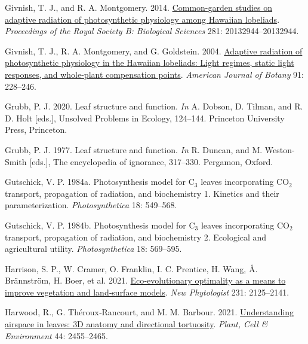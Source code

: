 \documentclass[
  letterpaper,
  DIV=11,
  numbers=noendperiod]{scrartcl}
\newlength{\cslhangindent}
\newlength{\cslentryspacingunit} %
\newenvironment{CSLReferences}[2] %
 {%
  \setlength{\parindent}{0pt}
  \ifodd #1
  \let\oldpar\par
  \def\par{\hangindent=\cslhangindent\oldpar}
  \fi
  \setlength{\parskip}{#2\cslentryspacingunit}
 }%
 {}
\begin{document}
\begin{CSLReferences}{1}{0}
\leavevmode{}%
Givnish, T. J., and R. A. Montgomery. 2014.
\href{https://doi.org/10.1098/rspb.2013.2944}{Common-garden studies on
adaptive radiation of photosynthetic physiology among {Hawaiian}
lobeliads}. \emph{Proceedings of the Royal Society B: Biological
Sciences} 281: 20132944--20132944.

\leavevmode{}%
Givnish, T. J., R. A. Montgomery, and G. Goldstein. 2004.
\href{https://doi.org/10.3732/ajb.91.2.228}{Adaptive radiation of
photosynthetic physiology in the {Hawaiian} lobeliads: Light regimes,
static light responses, and whole-plant compensation points}.
\emph{American Journal of Botany} 91: 228--246.

\leavevmode{}%
Grubb, P. J. 2020. Leaf structure and function. \emph{In} A. Dobson, D.
Tilman, and R. D. Holt {[}eds.{]}, Unsolved {Problems} in {Ecology},
124--144. Princeton University Press, Princeton.

\leavevmode{}%
Grubb, P. J. 1977. Leaf structure and function. \emph{In} R. Duncan, and
M. Weston-Smith {[}eds.{]}, The encyclopedia of ignorance, 317--330.
Pergamon, Oxford.

\leavevmode{}%
Gutschick, V. P. 1984a. Photosynthesis model for {C}\(_{\textrm{3}}\)
leaves incorporating {CO}\(_{\textrm{2}}\) transport, propagation of
radiation, and biochemistry 1. Kinetics and their parameterization.
\emph{Photosynthetica} 18: 549--568.

\leavevmode{}%
Gutschick, V. P. 1984b. Photosynthesis model for {C}\(_{\textrm{3}}\)
leaves incorporating {CO}\(_{\textrm{2}}\) transport, propagation of
radiation, and biochemistry 2. Ecological and agricultural utility.
\emph{Photosynthetica} 18: 569--595.

\leavevmode{}%
Harrison, S. P., W. Cramer, O. Franklin, I. C. Prentice, H. Wang, Å.
Brännström, H. Boer, et al. 2021.
\href{https://doi.org/10.1111/nph.17558}{Eco‐evolutionary optimality as
a means to improve vegetation and land‐surface models}. \emph{New
Phytologist} 231: 2125--2141.

\leavevmode{}%
Harwood, R., G. Théroux‐Rancourt, and M. M. Barbour. 2021.
\href{https://doi.org/10.1111/pce.14079}{Understanding airspace in
leaves: {3D} anatomy and directional tortuosity}. \emph{Plant, Cell \&
Environment} 44: 2455--2465.


\end{CSLReferences}
\end{document}
